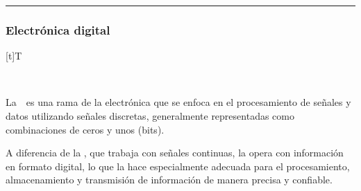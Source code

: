 \documentclass[letterpaper,10pt,spanish]{sphinxmanual}
\let\sphinxpxdimen\pdfpxdimen\else\newdimen\sphinxpxdimen
\begin{document}
\bigskip\hrule\bigskip



\subsubsection{Electrónica digital}
\label{\detokenize{1_guias/10informatica/G1004:electronica-digital}}

\begin{savenotes}\sphinxattablestart
\sphinxthistablewithglobalstyle
\centering
\begin{tabulary}{\linewidth}[t]{T}
\sphinxtoprule
\sphinxtableatstartofbodyhook

\begin{sphinxfigure-in-table}
\centering
\capstart
\noindent\sphinxincludegraphics[width=500\sphinxpxdimen]{{image052}.png}
\label{\detokenize{1_guias/10informatica/G1004:id5}}\end{sphinxfigure-in-table}\relax
\\
\sphinxbottomrule
\end{tabulary}
\sphinxtableafterendhook\par
\sphinxattableend\end{savenotes}

\sphinxAtStartPar
La  es una rama de la electrónica que se enfoca en el procesamiento de señales y datos utilizando señales discretas, generalmente representadas como combinaciones de ceros y unos (bits).

\sphinxAtStartPar
A diferencia de la , que trabaja con señales continuas, la  opera con información en formato digital, lo que la hace especialmente adecuada para el procesamiento, almacenamiento y transmisión de información de manera precisa y confiable.
\end{document}
